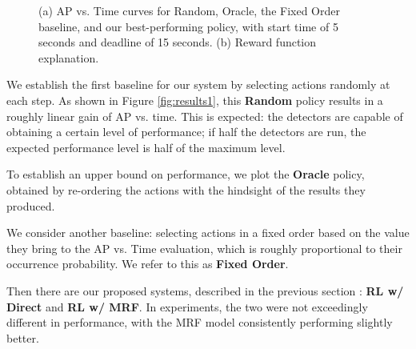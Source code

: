 \begin{figure}[h!]
\centering
{} \hfill
{}
\caption{(a) AP vs. Time curves for Random, Oracle, the Fixed Order baseline, and our best-performing policy, with start time of 5 seconds and deadline of 15 seconds. (b) Reward function explanation.}
\end{figure}

We establish the first baseline for our system by selecting actions randomly at each step.
As shown in Figure \autoref{fig:results1}, this \textbf{Random} policy results in a roughly linear gain of AP vs. time.
This is expected: the detectors are capable of obtaining a certain level of performance; if half the detectors are run, the expected performance level is half of the maximum level.

To establish an upper bound on performance, we plot the \textbf{Oracle} policy, obtained by re-ordering the actions with the hindsight of the results they produced.

We consider another baseline: selecting actions in a fixed order based on the value they bring to the AP vs. Time evaluation, which is roughly proportional to their occurrence probability.
We refer to this as \textbf{Fixed Order}.

Then there are our proposed systems, described in the previous section : \textbf{RL w/ Direct} and \textbf{RL w/ MRF}.
In experiments, the two were not exceedingly different in performance, with the MRF model consistently performing slightly better.

